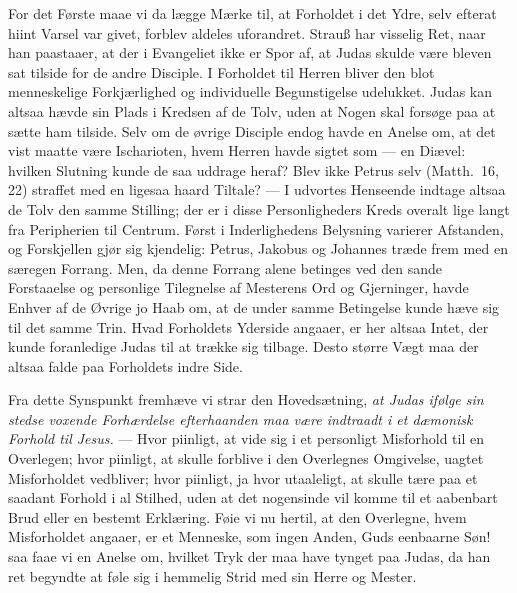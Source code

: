 \documentclass[12pt,a4paper]{book}
\begin{document}
For det Første maae vi da lægge Mærke til, at Forholdet i det Ydre, selv efterat hiint
Varsel var givet, forblev aldeles uforandret. Strauß har visselig Ret, naar han paastaaer,
at der i Evangeliet ikke er Spor af, at Judas skulde være bleven sat tilside for de andre
Disciple. I Forholdet til Herren bliver den blot menneskelige Forkjærlighed og individuelle
Begunstigelse udelukket. Judas kan altsaa hævde sin Plads i Kredsen af de Tolv, uden at Nogen
skal forsøge paa at sætte ham tilside. Selv om de øvrige Disciple endog havde en Anelse om,
at det vist maatte være Ischarioten, hvem Herren havde sigtet som --- en Diævel: hvilken
Slutning kunde de saa uddrage heraf? Blev ikke Petrus selv (Matth.\ 16, 22) straffet med en
ligesaa haard Tiltale? --- I udvortes Henseende indtage altsaa de Tolv den samme Stilling;
der er i disse Personligheders Kreds overalt lige langt fra Peripherien til Centrum. Først i
Inderlighedens Belysning varierer Afstanden, og Forskjellen gjør sig kjendelig: Petrus,
Jakobus og Johannes træde frem med en særegen Forrang. Men, da denne
Forrang alene betinges ved den sande Forstaaelse og personlige Tilegnelse af Mesterens Ord
og Gjerninger, havde Enhver af de Øvrige jo Haab om, at de under samme Betingelse kunde hæve
sig til det samme Trin. Hvad Forholdets Yderside angaaer, er her altsaa Intet, der kunde
foranledige Judas til at trække sig tilbage. Desto større Vægt maa der altsaa falde paa
Forholdets indre Side.

Fra dette Synspunkt fremhæve vi strar den Hovedsætning, \emph{at Judas ifølge sin stedse
voxende Forhærdelse efterhaanden maa være indtraadt i et dæmonisk Forhold til Jesus.} ---
Hvor piinligt, at vide sig i et personligt Misforhold til en Overlegen; hvor piinligt, at
skulle forblive i den Overlegnes Omgivelse, uagtet Misforholdet vedbliver; hvor piinligt, ja
hvor utaaleligt, at skulle tære paa et saadant Forhold i al Stilhed, uden at det nogensinde
vil komme til et aabenbart Brud eller en bestemt Erklæring. Føie vi nu hertil, at den
Overlegne, hvem Misforholdet angaaer, er et Menneske, som ingen Anden, Guds eenbaarne Søn!
saa faae vi en Anelse om, hvilket Tryk der maa have tynget paa Judas, da han ret begyndte at
føle sig i hemmelig Strid med sin Herre og Mester.
\end{document}
